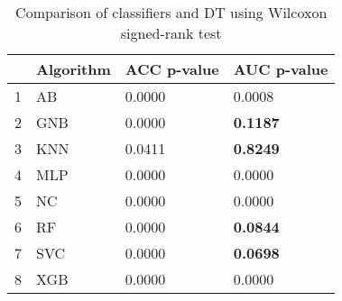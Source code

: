 \begin{table}
\footnotesize
\caption{Comparison of classifiers and DT using Wilcoxon signed-rank test}
\label{tab:wilcoxon comparison}
\begin{tabular}{llll}
\hline
 & Algorithm & ACC p-value & AUC p-value \\
\hline
1 & AB & 0.0000 & 0.0008 \\
2 & GNB & 0.0000 & \textbf{0.1187} \\
3 & KNN & 0.0411 & \textbf{0.8249} \\
4 & MLP & 0.0000 & 0.0000 \\
5 & NC & 0.0000 & 0.0000 \\
6 & RF & 0.0000 & \textbf{0.0844} \\
7 & SVC & 0.0000 & \textbf{0.0698} \\
8 & XGB & 0.0000 & 0.0000 \\
\hline
\end{tabular}
\end{table}
